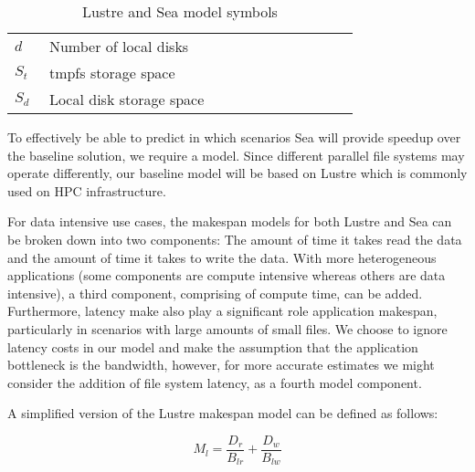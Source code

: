 \documentclass[10pt,journal,compsoc]{IEEEtran}
\begin{document}
\begin{table}
\begin{tabular}{|p{0.05\linewidth}|p{0.6\linewidth}|p{0.1\linewidth}|}
       $d$ & Number of local disks & \\              
       $S_{t}$ & tmpfs storage space & \\
       $S_{d}$ & Local disk storage space & \\
       \hline                                                                      
      \end{tabular}                                                                
      \caption{Lustre and Sea model symbols}                                       
      \label{table:1}                                                              
      \end{table}  



      To effectively be able to predict in which scenarios Sea will provide speedup
      over the baseline solution, we require a model. Since different parallel file
      systems may operate differently, our baseline model will be based on Lustre which
      is commonly used on HPC infrastructure.

      For data intensive use cases, the makespan models for both Lustre and Sea can be broken
      down into two components: The amount of time it takes read the data and the amount
      of time it takes to write the data. With more heterogeneous applications (some components
      are compute intensive whereas others are data intensive), a third component, comprising
      of compute time, can be added. Furthermore, latency make also play a significant role
      application makespan, particularly in scenarios with large amounts of small files.
      We choose to ignore latency costs in our model and make the assumption that the
      application bottleneck is the bandwidth, however, for more accurate estimates we
      might consider the addition of file system latency, as a fourth model component.

      A simplified version of the Lustre makespan model can be defined as follows:

      \begin{equation}\label{eq:lustrenpc}
          M_{l} =  \frac{D_{r}}{B_{lr}} + \frac{D_{w}}{B_{lw}}
      \end{equation}

\end{document}
